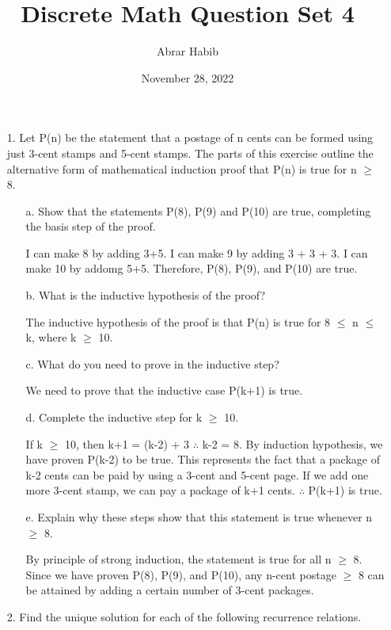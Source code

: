 \documentclass[letterpaper,11pt]{article}
\begin{document}
\title{Discrete Math Question Set 4}
\author{Abrar Habib}
\date{November 28, 2022}
\maketitle

\begin{enumerate}
    \item [1.] Let P(n) be the statement that a postage of n cents can be formed using just 3-cent stamps and 5-cent
    stamps. The parts of this exercise outline the alternative form of mathematical induction proof that P(n) is
    true for n $\geq$ 8.
    \begin{enumerate}
        \item [a.] Show that the statements P(8), P(9) and P(10) are true, completing the basis step of the proof.
        \item [] I can make 8 by adding 3+5. I can make 9 by adding 3 + 3 + 3. I can make 10 by addomg 5+5. Therefore, P(8), P(9), and P(10) are true.
        \item [b.] What is the inductive hypothesis of the proof?
        \item [] The inductive hypothesis of the proof is that P(n) is true for 8 $\leq$ n $\leq$ k, where k $\geq$ 10.
        \item [c.] What do you need to prove in the inductive step?
        \item [] We need to prove that the inductive case P(k+1) is true.
        \item [d.] Complete the inductive step for k $\geq$ 10.
        \item [] If k $\geq$ 10, then k+1 = (k-2) + 3 $\therefore $ k-2 = 8. By induction hypothesis, we have proven P(k-2) to be true. This represents the fact that a package of k-2 cents can be paid by using a 3-cent and 5-cent page. If we add one more 3-cent stamp, we can pay a package of k+1 cents. $\therefore$ P(k+1) is true.
        \item [e.] Explain why these steps show that this statement is true whenever n $\geq$ 8.
        \item [] By principle of strong induction, the statement is true for all n $\geq$ 8. Since we have proven P(8), P(9), and P(10), any n-cent postage $\geq$ 8 can be attained by adding a certain number of 3-cent packages.
    \end{enumerate}
    \item [2.] Find the unique solution for each of the following recurrence relations.

\end{enumerate}
\end{document}
